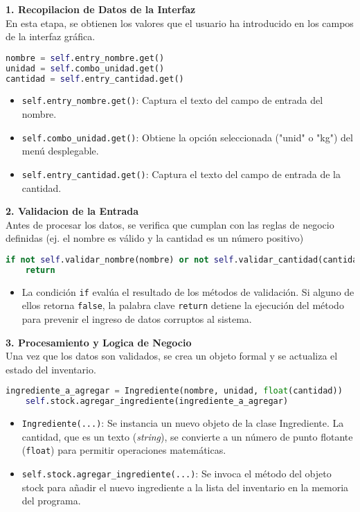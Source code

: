 \documentclass[a4paper,12pt]{article}
\begin{document}
\textbf{1. Recopilacion de Datos de la Interfaz}\\
En esta etapa, se obtienen los valores que el usuario ha introducido en los campos de la interfaz gráfica.
\begin{lstlisting}[language=Python, caption={desenglosando codigo}, frame=single]
nombre = self.entry_nombre.get()
unidad = self.combo_unidad.get()
cantidad = self.entry_cantidad.get()
\end{lstlisting}
\begin{itemize} \item \verb|self.entry_nombre.get()|: Captura el texto del campo de entrada del nombre. \item \verb|self.combo_unidad.get()|: Obtiene la opción seleccionada ("unid" o "kg") del menú desplegable. \item \verb|self.entry_cantidad.get()|: Captura el texto del campo de entrada de la cantidad. 
\end{itemize}
\textbf{2. Validacion de la Entrada}\\
Antes de procesar los datos, se verifica que cumplan con las reglas de negocio definidas (ej. el nombre es válido y la cantidad es un número positivo)
\begin{lstlisting}[language=Python, caption={desenglosando codigo}, frame=single]
    if not self.validar_nombre(nombre) or not self.validar_cantidad(cantidad):
    return
\end{lstlisting}

\begin{itemize} \item La condición \verb|if| evalúa el resultado de los métodos de validación. Si alguno de ellos retorna \verb|false|, la palabra clave \verb|return| detiene la ejecución del método para prevenir el ingreso de datos corruptos al sistema. \end{itemize}

\newpage
\textbf{3. Procesamiento y Logica de Negocio}\\
Una vez que los datos son validados, se crea un objeto formal y se actualiza el estado del inventario.

\begin{lstlisting}[language=Python, caption={desenglosando codigo}, frame=single]
    ingrediente_a_agregar = Ingrediente(nombre, unidad, float(cantidad))
    self.stock.agregar_ingrediente(ingrediente_a_agregar)
\end{lstlisting}
\begin{itemize} 
\item \verb|Ingrediente(...)|: Se instancia un nuevo objeto de la clase Ingrediente. La cantidad, que es un texto (\textit{string}), se convierte a un número de punto flotante (\verb|float|) para permitir operaciones matemáticas. 
\item \verb|self.stock.agregar_ingrediente(...)|: Se invoca el método del objeto stock para añadir el nuevo ingrediente a la lista del inventario en la memoria del programa. 
\end{itemize}
\end{document}
